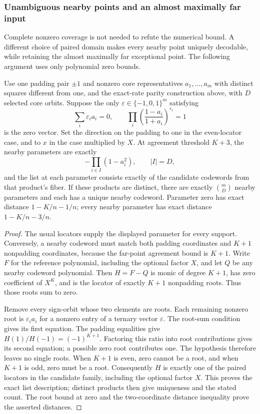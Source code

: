 \subsubsection{Unambiguous nearby points and an almost maximally far input}
\label{sec:paired-unique}

Complete nonzero coverage is not needed to refute the numerical bound.
A different choice of paired domain makes every nearby point uniquely
decodable, while retaining the almost maximally far exceptional point.
The following argument uses only polynomial zero bounds.

\begin{lemma}
\label{pd:unique-criterion}
Use one padding pair $\pm1$ and nonzero core representatives
$a_1,\ldots,a_m$ with distinct squares different from one,
and the exact-rate parity construction above, with $D$ selected core
orbits. Suppose the only $\varepsilon\in\{-1,0,1\}^m$ satisfying
\[
 \sum_i\varepsilon_i a_i=0,\qquad
 \prod_i\left(\frac{1-a_i}{1+a_i}\right)^{\varepsilon_i}=1
\]
is the zero vector. Set the direction on the padding to one in the
even-locator case, and to $x$ in the case multiplied by $X$.
At agreement threshold $K+3$, the nearby parameters are exactly
\[
 -\prod_{i\in I}(1-a_i^2),\qquad |I|=D,
\]
and the list at each parameter consists exactly of the candidate
codewords from that product's fiber. If these products are distinct,
there are exactly $\binom mD$ nearby parameters and each has a unique
nearby codeword. Parameter zero has exact distance $1-K/n-1/n$;
every nearby parameter has exact distance $1-K/n-3/n$.
\end{lemma}
\begin{proof}
The usual locators supply the displayed parameter for every support.
Conversely, a nearby codeword must match both padding
coordinates and $K+1$ nonpadding coordinates, because the far-point agreement
bound is $K+1$. Write $F$ for the reference polynomial, including the
optional factor $X$, and let $Q$ be any nearby codeword polynomial.
Then $H=F-Q$ is monic of degree $K+1$, has zero coefficient of $X^K$,
and is the locator of exactly $K+1$ nonpadding roots. Thus those roots sum to zero.

Remove every sign-orbit whose two elements are roots. Each remaining
nonzero root is $\varepsilon_i a_i$ for a nonzero entry of a ternary
vector $\varepsilon$. The root-sum condition gives its first equation.
The padding equalities give
$H(1)/H(-1)=(-1)^{K+1}$. Factoring this ratio into root contributions
gives its second equation; a possible zero root contributes one.
The hypothesis therefore leaves no single roots. When $K+1$ is
even, zero cannot be a root, and when $K+1$ is odd, zero must be a root.
Consequently $H$ is exactly one of the paired locators in the candidate
family, including the optional factor $X$. This proves the exact list
description; distinct products then give uniqueness and the stated count. The root bound at zero
and the two-coordinate distance inequality prove the asserted distances.
\end{proof}

